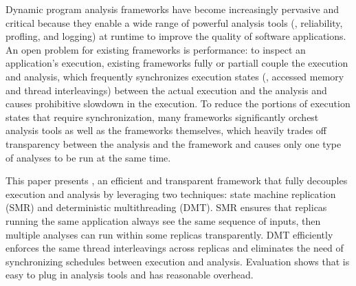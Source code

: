 
Dynamic program analysis frameworks have become increasingly pervasive and 
critical because they enable a wide range of powerful analysis tools (\eg, 
reliability, profling, and logging) at runtime to improve the quality of 
software applications. An open problem for existing frameworks is 
performance: to inspect an application's execution, existing frameworks 
fully or partiall couple the execution and analysis, which frequently 
synchronizes execution states (\eg, accessed memory and thread interleavings) 
between the actual execution and the analysis and causes prohibitive slowdown 
in the execution. To reduce the portions of execution states that require 
synchronization, many frameworks significantly orchest analysis tools as well 
as the frameworks themselves, which heavily trades off transparency between the 
analysis and the framework and causes only one type of analyses to be run at 
the same time.


This paper presents \xxx, an efficient and transparent framework that fully 
decouples execution and analysis by leveraging two techniques: state machine 
replication (SMR) and deterministic multithreading (DMT). SMR ensures that 
replicas running the same application always see the same sequence of inputs, 
then multiple analyses can run within some replicas transparently. DMT 
efficiently enforces the same thread interleavings across replicas and 
eliminates the need of synchronizing schedules between execution and analysis. 
Evaluation shows that \xxx is easy to plug in analysis tools and has reasonable 
overhead.